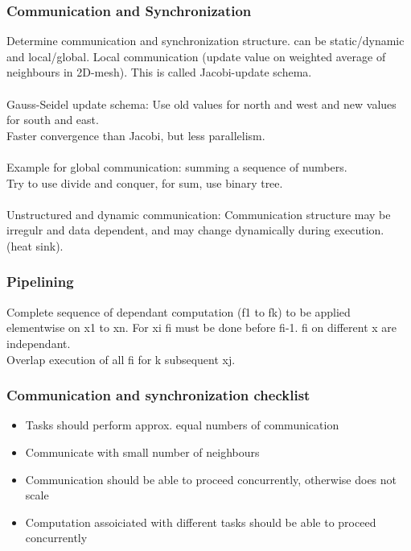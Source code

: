 \documentclass[a4paper]{article}
\begin{document}
\subsubsection{Communication and Synchronization}
Determine communication and synchronization structure. can be static/dynamic and
local/global. Local communication (update value on weighted average of neighbours
in 2D-mesh). This is called Jacobi-update schema.\\
\\Gauss-Seidel update schema: Use old values for north and west and new values for
south and east.
\\Faster convergence than Jacobi, but less parallelism.
\\
\\Example for global communication: summing a sequence of numbers.\\
Try to use divide and conquer, for sum, use binary tree.\\
\\Unstructured and dynamic communication: Communication structure may be irregulr
and data dependent, and may change dynamically during execution. (heat sink).

\subsubsection{Pipelining}
Complete sequence of dependant computation (f1 to fk) to be applied elementwise
on x1 to xn.  For xi fi must be done before fi-1. fi on different x are independant.
\\Overlap execution of all fi for k subsequent xj.

\subsubsection{Communication and synchronization checklist}
\begin{itemize}
    \item Tasks should perform approx. equal numbers of communication
    \item Communicate with small number of neighbours
    \item Communication should be able to proceed concurrently, otherwise does not scale
    \item Computation assoiciated with different tasks should be able to proceed concurrently
\end{itemize}
\end{document}
